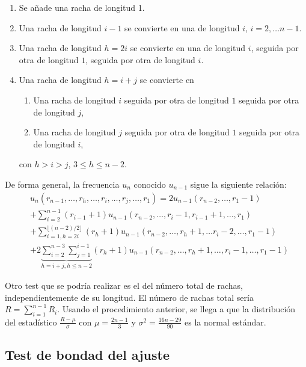 \begin{enumerate}
	\item Se añade una racha de longitud 1.
	\item Una racha de longitud $i-1$ se convierte en una 
		de longitud $i$, $i=2,\dots n-1$.
	\item Una racha de longitud $h=2i$ se convierte en una de 
		longitud $i$, seguida por otra de longitud $1$, 
		seguida por otra de longitud $i$.
	\item Una racha de longitud $h=i+j$ se convierte en
	\begin{enumerate}
		\item Una racha de longitud $i$ seguida por otra de 	
			longitud $1$ seguida por otra de longitud $j$,
		\item Una racha de longitud $j$ seguida por otra de 	
			longitud $1$ seguida por otra de longitud $i$,
	\end{enumerate}
		con $h>i>j$, $3 \leq h \leq n-2$.
\end{enumerate}

	De forma general, la frecuencia $u_n$ conocido $u_{n-1}$ 
sigue la siguiente relación:
\begin{align*}
	& u_n (r_{n-1}, \dots, r_h, \dots, r_i, \dots, r_j, 
			\dots, r_1)= 
		2 u_{n-1}(r_{n-2}, \dots, r_1-1) \\
	&+ \sum\limits_{i=2}^{n-1} 
		(r_{i-1} + 1)
		u_{n-1}(r_{n-2},\dots, r_i-1, r_{i-1}+1,\dots, r_1)\\
	&+ \sum\limits_{i=1, h=2i}^{\lfloor (n-2)/2 \rfloor} 
		(r_{h} + 1)
		u_{n-1}(r_{n-2},\dots, r_h+1,\dots r_i-2,
				\dots, r_1-1)\\
	&+ 2 \underbrace{\sum\limits_{i=2}^{n-3} 
		\sum\limits_{j=1}^{i-1}}_{h=i+j, h \leq n-2}
		(r_{h} + 1)
		u_{n-1}(r_{n-2},\dots, r_h+1,\dots, r_i-1,
				\dots, r_1-1)			
\end{align*}
	
	Otro test que se podría realizar es el del número total 
de rachas, independientemente de su longitud. El número de 
rachas total sería $R = \sum\limits_{i=1}^{n-1} R_i$. Usando 
el procedimiento anterior, se llega a que la distribución 
del estadístico $\frac{R-\mu}{\sigma}$ con $\mu = 
\frac{2n-1}{3}$ y $\sigma^2=\frac{16n-29}{90}$ es la 
normal estándar.
	
\subsection{Test de bondad del ajuste}

